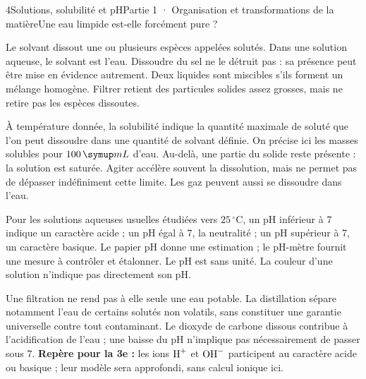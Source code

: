 \begin{ouverture}[college1]{4}{Solutions, solubilité et pH}{Partie 1 · Organisation et transformations de la matière}{Une eau limpide est-elle forcément pure ?}
\end{ouverture}
\label{ess-4}
Le solvant dissout une ou plusieurs espèces appelées solutés. Dans une solution aqueuse, le solvant est l’eau. Dissoudre du sel ne le détruit pas : sa présence peut être mise en évidence autrement. Deux liquides sont miscibles s’ils forment un mélange homogène. Filtrer retient des particules solides assez grosses, mais ne retire pas les espèces dissoutes.\par
{}
À température donnée, la solubilité indique la quantité maximale de soluté que l’on peut dissoudre dans une quantité de solvant définie. On précise ici les masses solubles pour $100\unite{mL}$ d’eau. Au-delà, une partie du solide reste présente : la solution est saturée. Agiter accélère souvent la dissolution, mais ne permet pas de dépasser indéfiniment cette limite. Les gaz peuvent aussi se dissoudre dans l’eau.\par
\clearpage
{}
Pour les solutions aqueuses usuelles étudiées vers $25\,^{\circ}\mathrm C$, un pH inférieur à 7 indique un caractère acide ; un pH égal à 7, la neutralité ; un pH supérieur à 7, un caractère basique. Le papier pH donne une estimation ; le pH-mètre fournit une mesure à contrôler et étalonner. Le pH est sans unité. La couleur d’une solution n’indique pas directement son pH.\par
{}
Une filtration ne rend pas à elle seule une eau potable. La distillation sépare notamment l’eau de certains solutés non volatils, sans constituer une garantie universelle contre tout contaminant. Le dioxyde de carbone dissous contribue à l’acidification de l’eau ; une baisse du pH n’implique pas nécessairement de passer sous 7. \textbf{Repère pour la 3e :} les ions $\ce{H+}$ et $\ce{OH-}$ participent au caractère acide ou basique ; leur modèle sera approfondi, sans calcul ionique ici.\par
